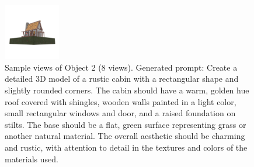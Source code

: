 \begin{figure}[htbp]
  \includegraphics[width=0.22\textwidth]{images/data/samples/obj2/007.jpeg}
  \caption{Sample views of Object 2 (8 views). Generated prompt: Create a detailed 3D model of a rustic cabin with a rectangular shape and slightly rounded corners. The cabin should have a warm, golden hue roof covered with shingles, wooden walls painted in a light color, small rectangular windows and door, and a raised foundation on stilts. The base should be a flat, green surface representing grass or another natural material. The overall aesthetic should be charming and rustic, with attention to detail in the textures and colors of the materials used.}
  \label{fig:dataset-sample-obj2}
\end{figure}

